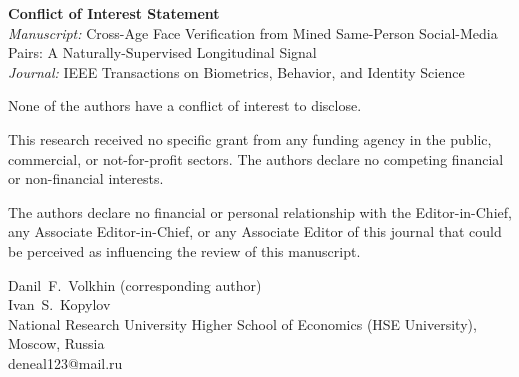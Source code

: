 \documentclass[11pt,a4paper]{article}
\begin{document}
\begin{center}
{\large\bfseries Conflict of Interest Statement}\\[2mm]
{\itshape Manuscript:} Cross-Age Face Verification from Mined Same-Person Social-Media Pairs:
A Naturally-Supervised Longitudinal Signal\\
{\itshape Journal:} IEEE Transactions on Biometrics, Behavior, and Identity Science
\end{center}

\vspace{4mm}

None of the authors have a conflict of interest to disclose.

This research received no specific grant from any funding agency in the public, commercial, or
not-for-profit sectors. The authors declare no competing financial or non-financial interests.

The authors declare no financial or personal relationship with the Editor-in-Chief, any Associate
Editor-in-Chief, or any Associate Editor of this journal that could be perceived as influencing the
review of this manuscript.

\vspace{6mm}
\noindent
Danil~F.~Volkhin (corresponding author)\\
Ivan~S.~Kopylov\\
National Research University Higher School of Economics (HSE University), Moscow, Russia\\
deneal123@mail.ru
\end{document}
